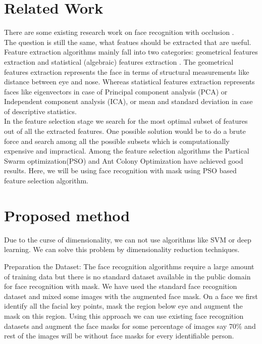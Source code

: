 \documentclass[a4paper,12pt]{report}
\begin{document}
\pagebreak



\chapter{Related Work}
There are some existing research work on face recognition with occlusion \cite{conference6}.\\
The question is still the same, what featues should be extracted that are useful. Feature extraction algorithms mainly fall into two categories: geometrical features extraction and statistical (algebraic) features extraction \cite{conference5}. The geometrical features extraction represents the face in terms of structural measurements like distance between eye and nose\cite{conference3}. Whereas statistical features extraction represents faces like eigenvectors in case of Principal component analysis (PCA) or Independent component analysis (ICA), or mean and standard deviation in case of descriptive statistics\cite{conference1}.\\
In the feature selection stage we search for the most optimal subset of features out of all the extracted features. One possible solution would be to do a brute force and search among all the possible subsets which is computationally expensive and impractical. Among the feature selection algorithms the Partical Swarm optimization(PSO) and Ant Colony Optimization have achieved good results\cite{conference7}. Here, we will be using face recognition with mask using PSO based feature selection algorithm. 



\chapter{Proposed method}
Due to the curse of dimensionality, we can not use algorithms like SVM or deep learning. We can solve this problem by dimensionality reduction techniques.

Preparation the Dataset: The face recognition algorithms require a large amount of training data but there is no standard dataset available in the public domain for face recognition with mask. We have used the standard face recognition dataset and mixed some images with the augmented face mask. On a face we first identify all the facial key points, mask the region below eye and augment the mask on this region. Using this approach we can use existing face recognition datasets and augment the face masks for some percentage of images say 70\% and rest of the images will be without face masks for every identifiable person.
\end{document}
